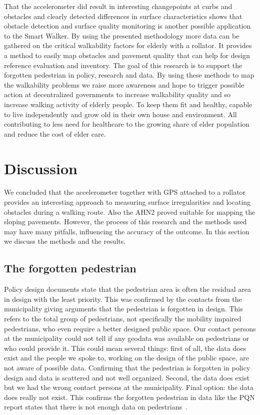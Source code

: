 That the accelerometer did result in interesting changepoints at curbs and obstacles and clearly detected differences in surface characteristics shows that obstacle detection and surface quality monitoring is another possible application to the Smart Walker. By using the presented methodology more data can be gathered on the critical walkability factors for elderly with a rollator. It provides a method to easily map obstacles and pavement quality that can help for design reference evaluation and inventory. The goal of this research is to support the forgotten pedestrian in policy, research and data. By using these methods to map the walkability problems we raise more awareness and hope to trigger possible action at decentralized governments to increase walkability quality and so increase walking activity of elderly people. To keep them fit and healthy, capable to live independently and grow old in their own house and environment. All contributing to less need for healthcare to the growing share of elder population and reduce the cost of elder care.

\section{Discussion} %
We concluded that the accelerometer together with GPS attached to a rollator provides an interesting approach to measuring surface irregularities and locating obstacles during a walking route. Also the AHN2 proved suitable for mapping the sloping pavements. However, the process of this research and the methods used may have many pitfalls, influencing the accuracy of the outcome. In this section we discuss the methods and the results. 

\subsection{The forgotten pedestrian}
Policy design documents state that the pedestrian area is often the residual area in design with the least priority. This was confirmed by the contacts from the municipality giving arguments that the pedestrian is forgotten in design. This refers to the total group of pedestrians, not specifically the mobility impaired pedestrians, who even require a better designed public space. 
Our contact persons at the municipality could not tell if any geodata was available on pedestrians or who could provide it. This could mean several things: first of all, the data does exist and the people we spoke to, working on the design of the public space, are not aware of possible data. Confirming that the pedestrian is forgotten in policy design and data is scattered and not well organized. Second, the data does exist but we had the wrong contact persons at the municipality. Final option: the data does really not exist. This confirms the forgotten pedestrian in data like the PQN report states that there is not enough data on pedestrians~\cite{Sauter2010}. 

